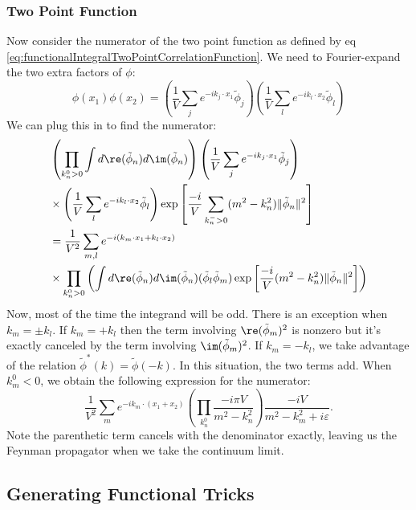 \subsubsection{Two Point Function} 

Now consider the numerator of the two point function as defined
by eq
\eqref{eq:functionalIntegralTwoPointCorrelationFunction}. We need
to Fourier-expand the two extra factors of $\phi$:
\begin{equation}%
\phi(x_1)\phi(x_2) = \left(\frac{1}{V}\sum_{j}e^{-ik_{j}\cdot{x_1}}\tilde{\phi}_{j}\right)\left(\frac{1}{V}\sum_{l}e^{-ik_{l}\cdot{x_2}}\tilde{\phi}_{l}\right)
\end{equation}
We can plug this in to find the numerator:
\begin{equation}%
\begin{split}
&\left(\prod_{k^{0}_{n}>0}\int
d\re(\tilde{\phi}_{n})d\im(\tilde{\phi}_{n})\right)\left(\frac{1}{V}\sum_{j}e^{-ik_{j}\cdot{x_1}}\tilde{\phi}_{j}\right)\\
&\times\left(\frac{1}{V}\sum_{l}e^{-ik_{l}\cdot{x_2}}\tilde{\phi}_{l}\right)\exp\left[\frac{-i}{V}\sum_{k^{-}_{n}>0}(m^{2}-k_{n}^{2})\|\tilde{\phi}_{n}\|^{2}\right]\\
&= \frac{1}{V^{2}}\sum_{m,l}e^{-i(k_{m}\cdot x_{1}+k_{l}\cdot
  x_{2})}\\
&\times\prod_{k^{0}_{n}>0}\left(\int
d\re(\tilde{\phi}_{n})d\im(\tilde{\phi}_{n}) (\tilde{\phi}_{l}\tilde{\phi}_{m})\exp\left[\frac{-i}{V}(m^{2}-k_{n}^{2})\|\tilde{\phi}_{n}\|^{2}\right]\right)
\end{split}
\end{equation}
Now, most of the time the integrand will be odd. There is an
exception when $k_m = \pm k_l$. If $k_m = +k_l$ then the term
involving $\re(\tilde{\phi}_m)^2$ is nonzero but it's exactly
canceled by the term involving $\im(\tilde{\phi}_m)^2$. If
$k_m=-k_l$, we take advantage of the relation
$\tilde{\phi}^{*}(k)=\tilde{\phi}(-k)$. In this situation, the
two terms add. When $k^{0}_{m}<0$, we obtain the following
expression for the numerator:
\begin{equation}%
\frac{1}{V^{2}}\sum_{m}e^{-ik_{m}\cdot(x_{1}+x_{2})}\left(\prod_{k^{0}_{n}}\frac{-i\pi{V}}{m^{2}-k_{n}^{2}}\right)\frac{-iV}{m^{2}-k_{m}^{2}+i\varepsilon}.
\end{equation}
Note the parenthetic term cancels with the denominator exactly,
leaving us the Feynman propagator when we take the continuum limit.


\subsection{Generating Functional Tricks}


